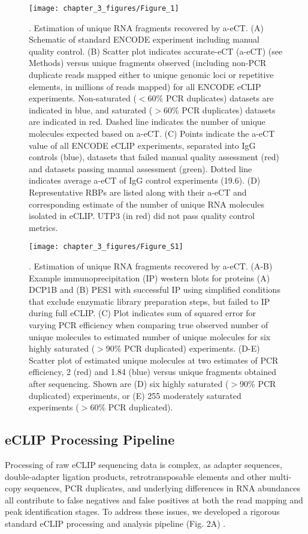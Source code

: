 \begin{figure}[ht]
  \centering
  \texttt{[image: chapter\_3\_figures/Figure\_1]}
  \caption[Figure 1]{. Estimation of unique RNA fragments recovered by a-eCT. (A) Schematic of standard ENCODE experiment including manual quality control. (B) Scatter plot indicates accurate-eCT (a-eCT) (see Methods) versus unique fragments observed (including non-PCR duplicate reads mapped either to unique genomic loci or repetitive elements, in millions of reads mapped) for all ENCODE eCLIP experiments. Non-saturated ($<$60\% PCR duplicates) datasets are indicated in blue, and saturated ($>$60\% PCR duplicates) datasets are indicated in red. Dashed line indicates the number of unique molecules expected based on a-eCT. (C) Points indicate the a-eCT value of all ENCODE eCLIP experiments, separated into IgG controls (blue), datasets that failed manual quality assessment (red) and datasets passing manual assessment (green). Dotted line indicates average a-eCT of IgG control experiments (19.6). (D) Representative RBPs are listed along with their a-eCT and corresponding estimate of the number of unique RNA molecules isolated in eCLIP. UTP3 (in red) did not pass quality control metrics.}
  \label{fig:Figure_1}
  \end{figure}

\begin{figure}[ht]
  \centering
  \texttt{[image: chapter\_3\_figures/Figure\_S1]}
  \caption[Supplementary Figure 1]{. Estimation of unique RNA fragments recovered by a-eCT. (A-B) Example immunoprecipitation (IP) western blots for proteins (A) DCP1B and (B) PES1 with successful IP using simplified conditions that exclude enzymatic library preparation steps, but failed to IP during full eCLIP. (C) Plot indicates sum of squared error for varying PCR efficiency when comparing true observed number of unique molecules to estimated number of unique molecules for six highly saturated ($>$90\% PCR duplicated) experiments. (D-E) Scatter plot of estimated unique molecules at two estimates of PCR efficiency, 2 (red) and 1.84 (blue) versus unique fragments obtained after sequencing. Shown are (D) six highly saturated ($>$90\% PCR duplicated) experiments, or (E) 255 moderately saturated experiments ($>$60\% PCR duplicated).}
  \label{fig:Figure_S1}
\end{figure}

\subsection{eCLIP Processing Pipeline}
Processing of raw eCLIP sequencing data is complex, as adapter sequences, double-adapter ligation products, retrotransposable elements and other multi-copy sequences, PCR duplicates, and underlying differences in RNA abundances all contribute to false negatives and false positives at both the read mapping and peak identification stages. To address these issues, we developed a rigorous standard eCLIP processing and analysis pipeline (Fig. 2A) \cite{VanNostrand2016}.


